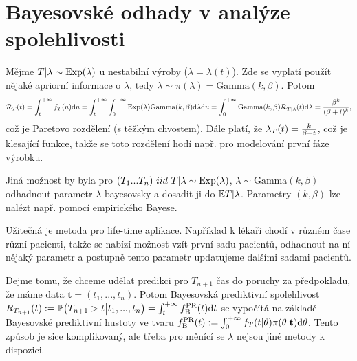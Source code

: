 \section{Bayesovské odhady v analýze spolehlivosti}

\begin{define}
	Mějme $T|\lambda\sim \mathrm{Exp}(\lambda)$ u nestabilní výroby ($\lambda=\lambda(t)$). Zde se vyplatí použít nějaké apriorní informace o $\lambda$, tedy $\lambda\sim\pi(\lambda)=\mathrm{Gamma}(k,\beta)$. Potom
	$$ \mathcal{R}_T(t)=\int_{t}^{+\infty}f_T(u)\mathrm{d} u=\int_{t}^{+\infty}\int_{0}^{+\infty}\mathrm{Exp}(\lambda)\mathrm{Gamma}(k,\beta)\mathrm{d}\lambda\mathrm{d} u =\int_{0}^{+\infty}\mathrm{Gamma}(k,\beta)\mathcal{R}_{T|\lambda}(t)\mathrm{d}\lambda=\frac{\beta^k}{(\beta+t)^k}, $$
	což je Paretovo rozdělení (s těžkým chvostem). Dále platí, že $\lambda_T(t)=\frac{k}{\beta+t}$, což je klesající funkce, takže se toto rozdělení hodí např. pro modelování první fáze výrobku.
\end{define}

\begin{example}
	Jiná možnost by byla pro $(T_1...T_n)~iid~T|\lambda\sim\mathrm{Exp}(\lambda)$, $\lambda\sim\mathrm{Gamma}(k,\beta)$ odhadnout parametr $\lambda$ bayesovsky a dosadit ji do $\mathbb{E} T|\lambda$. Parametry $(k, \beta)$ lze nalézt např. pomocí empirického Bayese.
\end{example}

	Užitečná je metoda pro life-time aplikace. Například k lékaři chodí v různém čase různí pacienti, takže se nabízí možnost vzít první sadu pacientů, odhadnout na ní nějaký parametr a postupně tento parametr updatujeme dalšími sadami pacientů.

Dejme tomu, že chceme udělat predikci pro $T_{n+1}$ čas do poruchy za předpokladu, že máme data $\textbf{t}=(t_1,...,t_n)$. Potom Bayesovská prediktivní spolehlivost $R_{T_{n+1}}(t):=\mathbb{P}\big(T_{n+1}>t\big| t_1,...,t_n\big)=\int_{t}^{+\infty}f_\mathrm{B}^{\mathrm{PR}}(t)\mathrm{d} t$ se vypočítá na základě Bayesovské prediktivní hustoty ve tvaru $f_\mathrm{B}^{\mathrm{PR}}(t):=\int_{0}^{+\infty}f_T(t|\theta)\pi(\theta|\textbf{t})\mathrm{d}\theta$. Tento způsob je sice komplikovaný, ale třeba pro měnící se $\lambda$ nejsou jiné metody k dispozici.